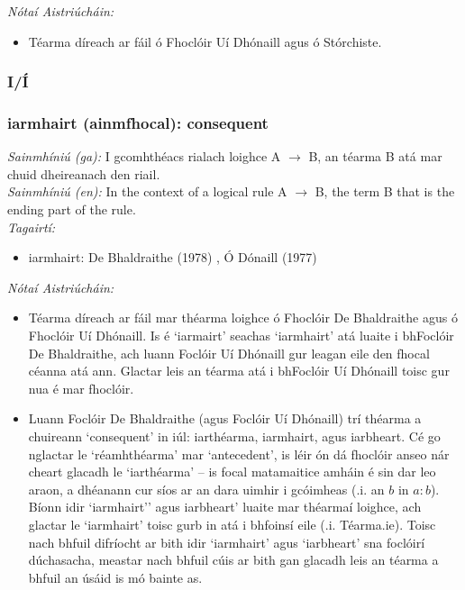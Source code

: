 \noindent \textit{Nótaí Aistriúcháin:}
\begin{itemize}
	\item Téarma díreach ar fáil ó Fhoclóir Uí Dhónaill agus ó Stórchiste.
\end{itemize}


 \subsubsection*{I/Í}

\subsubsection*{iarmhairt (ainmfhocal): consequent}
 \noindent \textit{Sainmhíniú (ga):} I gcomhthéacs rialach loighce A $\rightarrow$ B, an téarma B atá mar chuid dheireanach den riail.
\\
 \noindent \textit{Sainmhíniú (en):} In the context of a logical rule A $\rightarrow$ B, the term B that is the ending part of the rule.
\\
 \noindent \textit{Tagairtí:}
\begin{itemize}
	\item iarmhairt: De Bhaldraithe (1978) \cite{de-bhaldraithe}, Ó Dónaill (1977) \cite{odonaill}
\end{itemize}

 \noindent \textit{Nótaí Aistriúcháin:}
\begin{itemize}
	\item Téarma díreach ar fáil mar théarma loighce ó Fhoclóir De Bhaldraithe agus ó Fhoclóir Uí Dhónaill. Is é `iarmairt' seachas `iarmhairt' atá luaite i bhFoclóir De Bhaldraithe, ach luann Foclóir Uí Dhónaill gur leagan eile den fhocal céanna atá ann. Glactar leis an téarma atá i bhFoclóir Uí Dhónaill toisc gur nua é mar fhoclóir.
	\item Luann Foclóir De Bhaldraithe (agus Foclóir Uí Dhónaill) trí théarma a chuireann `consequent' in iúl: iarthéarma, iarmhairt, agus iarbheart. Cé go nglactar le `réamhthéarma' mar `antecedent', is léir ón dá fhoclóir anseo nár cheart glacadh le `iarthéarma' -- is focal matamaitice amháin é sin dar leo araon, a dhéanann cur síos ar an dara uimhir i gcóimheas (.i. an $b$ in $a:b$). Bíonn idir `iarmhairt'' agus iarbheart' luaite mar théarmaí loighce, ach glactar le `iarmhairt' toisc gurb in atá i bhfoinsí eile (.i. Téarma.ie). Toisc nach bhfuil difríocht ar bith idir `iarmhairt' agus `iarbheart' sna foclóirí dúchasacha, meastar nach bhfuil cúis ar bith gan glacadh leis an téarma a bhfuil an úsáid is mó bainte as.
\end{itemize}


